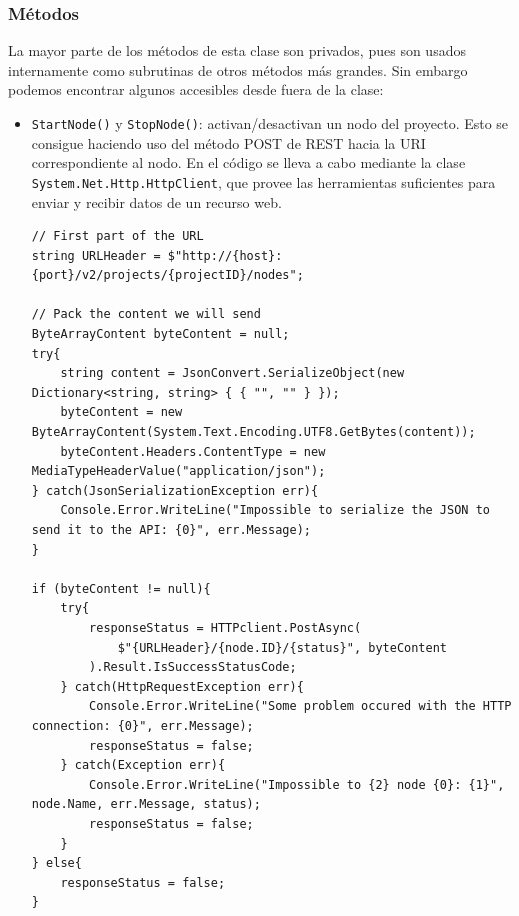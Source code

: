 \subsubsection{Métodos}
La mayor parte de los métodos de esta clase son privados, pues son usados internamente como subrutinas de otros métodos más grandes. Sin embargo podemos encontrar algunos accesibles desde fuera de la clase:
\begin{itemize}
\item \texttt{StartNode()} y \texttt{StopNode()}: activan/desactivan un nodo del proyecto. Esto se consigue haciendo uso del método POST de REST hacia la URI correspondiente al nodo. En el código se lleva a cabo mediante la clase \texttt{System.Net.Http.HttpClient}, que provee las herramientas suficientes para enviar y recibir datos de un recurso web.

\begin{lstlisting}[language={[Sharp]C}, caption={Activación/desactivación de un nodo}, label={gnscs5}]
// First part of the URL
string URLHeader = $"http://{host}:{port}/v2/projects/{projectID}/nodes";

// Pack the content we will send
ByteArrayContent byteContent = null;
try{
    string content = JsonConvert.SerializeObject(new Dictionary<string, string> { { "", "" } });
    byteContent = new ByteArrayContent(System.Text.Encoding.UTF8.GetBytes(content));
    byteContent.Headers.ContentType = new MediaTypeHeaderValue("application/json");
} catch(JsonSerializationException err){
    Console.Error.WriteLine("Impossible to serialize the JSON to send it to the API: {0}", err.Message);
}

if (byteContent != null){
    try{
        responseStatus = HTTPclient.PostAsync(
            $"{URLHeader}/{node.ID}/{status}", byteContent
        ).Result.IsSuccessStatusCode;
    } catch(HttpRequestException err){
        Console.Error.WriteLine("Some problem occured with the HTTP connection: {0}", err.Message);
        responseStatus = false;
    } catch(Exception err){
        Console.Error.WriteLine("Impossible to {2} node {0}: {1}", node.Name, err.Message, status);
        responseStatus = false;
    }
} else{
    responseStatus = false;
}
\end{lstlisting}


\end{itemize}
